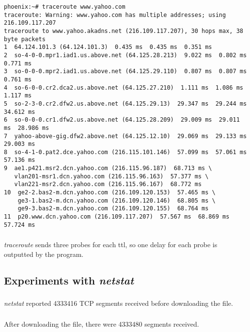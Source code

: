 \documentclass[11pt]{article}
\begin{document}
\begin{verbatim}
phoenix:~# traceroute www.yahoo.com
traceroute: Warning: www.yahoo.com has multiple addresses; using 216.109.117.207
traceroute to www.yahoo.akadns.net (216.109.117.207), 30 hops max, 38 byte packets
1  64.124.101.3 (64.124.101.3)  0.435 ms  0.435 ms  0.351 ms
2  so-4-0-0.mpr1.iad1.us.above.net (64.125.28.213)  9.022 ms  0.802 ms  0.771 ms
3  so-0-0-0.mpr2.iad1.us.above.net (64.125.29.110)  0.807 ms  0.807 ms  0.761 ms
4  so-6-0-0.cr2.dca2.us.above.net (64.125.27.210)  1.111 ms  1.086 ms  1.117 ms
5  so-2-3-0.cr2.dfw2.us.above.net (64.125.29.13)  29.347 ms  29.244 ms  34.612 ms
6  so-0-0-0.cr1.dfw2.us.above.net (64.125.28.209)  29.009 ms  29.011 ms  28.986 ms
7  yahoo-above-gig.dfw2.above.net (64.125.12.10)  29.069 ms  29.133 ms  29.003 ms
8  so-4-1-0.pat2.dce.yahoo.com (216.115.101.146)  57.099 ms  57.061 ms  57.136 ms
9  ae1.p421.msr2.dcn.yahoo.com (216.115.96.187)  68.713 ms \
   vlan201-msr1.dcn.yahoo.com (216.115.96.163)  57.377 ms \
   vlan221-msr2.dcn.yahoo.com (216.115.96.167)  68.772 ms
10  ge2-2.bas2-m.dcn.yahoo.com (216.109.120.153)  57.465 ms \
    ge3-1.bas2-m.dcn.yahoo.com (216.109.120.146)  68.805 ms \
    ge9-3.bas2-m.dcn.yahoo.com (216.109.120.155)  68.764 ms
11  p20.www.dcn.yahoo.com (216.109.117.207)  57.567 ms  68.869 ms  57.724 ms
\end{verbatim}

\subsubsection{}

\emph{traceroute} sends three probes for each ttl, so one delay for each probe is outputted by the program.

\subsection{Experiments with \emph{netstat}}

\subsubsection{}

\emph{netstat} reported 4333416 TCP segments received before downloading the file.

\subsubsection{}

After downloading the file, there were 4333480 segments received.
\end{document}
